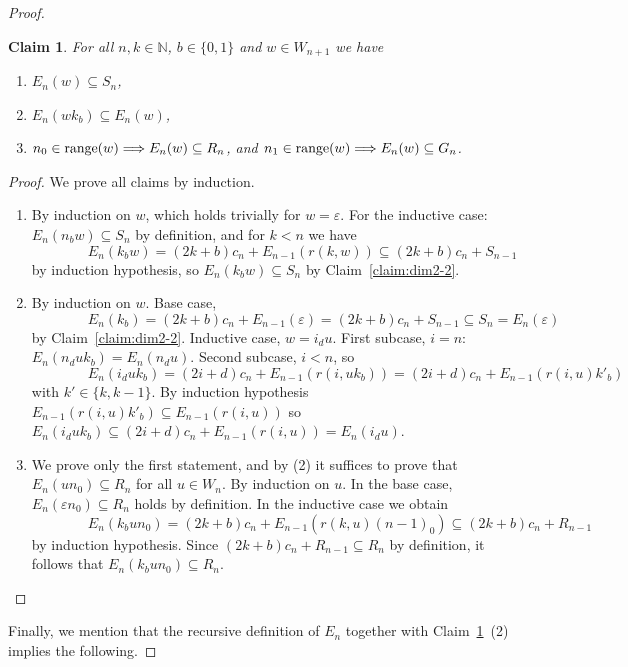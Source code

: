 \documentclass[a4paper]{amsart}
\def\IN{{\mathbb{N}}}
\def\TO{\Longrightarrow}
\def\range{{\rm range}}
\newtheorem{localclaim}{Claim}[theorem]
\theoremstyle{definition}
\begin{document}
\begin{proof}
\begin{localclaim}
\label{claim:dim2-3}
For all $n,k\in\IN$, $b\in\{0,1\}$ and $w\in W_{n+1}$  we have
\begin{enumerate}
\item $E_n(w) \subseteq S_n$,
\item $E_n(wk_b) \subseteq E_n(w)$,
\item $n_0 \in \range(w)\TO E_n(w) \subseteq R_n$, and $n_1 \in \range(w)\TO E_n(w) \subseteq G_n$.
\end{enumerate}
\end{localclaim}
\begin{proof}
We prove all claims by induction.
\begin{enumerate}
\item By induction on $w$, which holds trivially for $w = \varepsilon$. For the inductive case: $E_n(n_bw) \subseteq S_n$ by definition, and for $k < n$ we have 
\[\qquad\qquad E_n(k_bw) = (2k+b)c_n + E_{n-1}(r(k,w)) \subseteq (2k+b)c_n + S_{n-1}\] 
by induction hypothesis, so $E_n(k_bw) \subseteq S_n$ by Claim~\ref{claim:dim2-2}.

\item By induction on $w$. Base case, 
\[\qquad\qquad E_n(k_b) = {(2k+b)c_n + E_{n-1}(\varepsilon)} =  {(2k+b)c_n} + S_{n-1} \subseteq S_n = E_n(\varepsilon)\]  by Claim~\ref{claim:dim2-2}. 
Inductive case, $w = i_du$. First subcase, $i = n$: $E_n(n_duk_b) = E_n(n_du)$. Second subcase, $i < n$, so 
\[\qquad\qquad E_n(i_duk_b) = (2i+d)c_n + E_{n-1}(r(i,uk_b)) = (2i+d)c_n + E_{n-1}(r(i,u)k'_b)\] 
with $k' \in \{k,k-1\}$. By induction hypothesis $E_{n-1}(r(i,u)k'_b) \subseteq E_{n-1}(r(i,u))$ so $E_n(i_duk_b) \subseteq (2i+d)c_n + E_{n-1}(r(i,u)) = E_n(i_du)$.

\item We prove only the first statement, and by (2) it suffices to prove that $E_n(un_0) \subseteq R_n$ for all $u\in W_n$. 
By induction on $u$. In the base case, $E_n(\varepsilon n_0) \subseteq R_n$ holds by definition. In the inductive case we obtain
\[\qquad\qquad E_n(k_bun_0) = (2k+b)c_n + E_{n-1}(r(k,u)(n-1)_0) \subseteq (2k+b)c_n + R_{n-1}\]
by induction hypothesis. Since $(2k+b)c_n + R_{n-1} \subseteq R_n$ by definition, it follows that $E_n(k_bun_0) \subseteq R_n$.
\qedhere
\end{enumerate}
\end{proof}

Finally, we mention that the recursive definition of $E_n$ together with Claim~\ref{claim:dim2-3}~(2) implies the following.


\end{proof}
\end{document}
